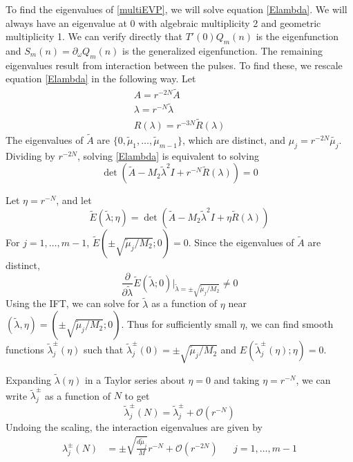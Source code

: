 \documentclass[12pt]{article}
\begin{document}
To find the eigenvalues of \eqref{multiEVP}, we will solve equation \eqref{Elambda}. We will always have an eigenvalue at 0 with algebraic multiplicity 2 and geometric multiplicity 1. We can verify directly that $T'(0) Q_m(n)$ is the eigenfunction and $S_m(n) = \partial_\omega Q_m(n)$ is the generalized eigenfunction. The remaining eigenvalues result from interaction between the pulses. To find these, we rescale equation \eqref{Elambda} in the following way. Let
\begin{align*}
A = r^{-2N} \tilde{A} \\
\lambda = r^{-N} \tilde{\lambda} \\
R(\lambda) = r^{-3N} \tilde{R}(\lambda)
\end{align*}
The eigenvalues of $\tilde{A}$ are $\{0, \tilde{\mu}_1, \dots, \tilde{\mu}_{m-1}\}$, which are distinct, and $\mu_j = r^{-2N} \tilde{\mu_j}$. Dividing by $r^{-2N}$, solving \eqref{Elambda} is equivalent to solving
\[
\det(\tilde{A} - M_2 \tilde{\lambda}^2 I + r^{-N} \tilde{R}(\lambda)) = 0
\]

Let $\eta = r^{-N}$, and let
\begin{equation}\label{deftildeE}
\tilde{E}(\tilde{\lambda}; \eta) = \det(\tilde{A} - M_2 \tilde{\lambda}^2 I + \eta \tilde{R}(\lambda))
\end{equation}
For $j = 1, \dots, m-1$, $\tilde{E}(\pm \sqrt{\tilde{\mu}_j / M_2 }; 0) = 0$. Since the eigenvalues of $\tilde{A}$ are distinct, 
\[
\frac{\partial}{\partial \tilde{\lambda}} \tilde{E}(\tilde{\lambda}; 0)\Big|_{\tilde{\lambda} = \pm \sqrt{\tilde{\mu}_j / M_2 }} \neq 0
\]
Using the IFT, we can solve for $\tilde{\lambda}$ as a function of $\eta$ near $(\tilde{\lambda}, \eta) = (\pm \sqrt{\tilde{\mu}_j / M_2 }; 0)$. Thus for sufficiently small $\eta$, we can find smooth functions $\tilde{\lambda}_j^\pm(\eta)$ such that $\tilde{\lambda}_j^\pm(0) = \pm \sqrt{\tilde{\mu}_j / M_2 }$ and $E(\tilde{\lambda}_j^\pm(\eta); \eta) = 0$. 

Expanding $\tilde{\lambda}(\eta)$ in a Taylor series about $\eta = 0$ and taking $\eta = r^{-N}$, we can write $\tilde{\lambda}_j^\pm$ as a function of $N$ to get 
\begin{equation*}
\tilde{\lambda}_j^\pm(N) = \tilde{\lambda}_j^\pm + \mathcal{O}(r^{-N})
\end{equation*}
Undoing the scaling, the interaction eigenvalues are given by
\begin{align*}
\lambda^\pm_j(N) &= \pm \sqrt{\frac{d \tilde{\mu}_j}{M}} r^{-N} + \mathcal{O}(r^{-2N}) && j = 1, \dots, m-1 
\end{align*}
\end{document}
